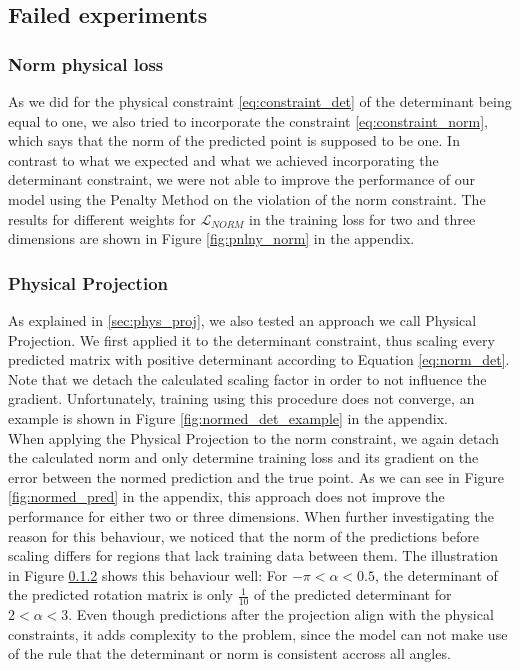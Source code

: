 





\subsection{Failed experiments}

\subsubsection{Norm physical loss}
As we did for the physical constraint \ref{eq:constraint_det} of the determinant being equal to one, we also tried to incorporate the constraint \ref{eq:constraint_norm}, which says that the norm of the predicted point is supposed to be one. In contrast to what we expected and what we achieved incorporating the determinant constraint, we were not able to improve the performance of our model using the Penalty Method on the violation of the norm constraint. The results for different weights for $\mathcal{L}_{NORM}$ in the training loss for two and three dimensions are shown in Figure \ref{fig:pnlny_norm} in the appendix.

\subsubsection{Physical Projection}
As explained in \ref{sec:phys_proj}, we also tested an approach we call Physical Projection. We first applied it to the determinant constraint, thus scaling every predicted matrix with positive determinant according to Equation \ref{eq:norm_det}. Note that we detach the calculated scaling factor in order to not influence the gradient. Unfortunately, training using this procedure does not converge, an example is shown in Figure \ref{fig:normed_det_example} in the appendix.\\
\indent When applying the Physical Projection to the norm constraint, we again detach the calculated norm and only determine training loss and its gradient on the error between the normed prediction and the true point. As we can see in Figure \ref{fig:normed_pred} in the appendix, this approach does not improve the performance for either two or three dimensions. When further investigating the reason for this behaviour, we noticed that the norm of the predictions before scaling differs for regions that lack training data between them. The illustration in Figure \ref{} shows this behaviour well: For $-\pi < \alpha < 0.5$, the determinant of the predicted rotation matrix is only $\frac{1}{10}$ of the predicted determinant for $2 < \alpha < 3$. Even though predictions after the projection align with the physical constraints, it adds complexity to the problem, since the model can not make use of the rule that the determinant or norm is consistent accross all angles.







\clearpage

